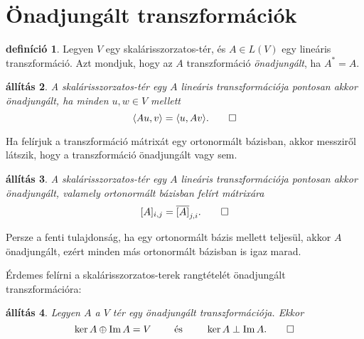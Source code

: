 \documentclass[9pt, a4paper, showtrims]{memoir}
\theoremstyle{plain}
\newtheorem{proposition}{állítás}[chapter]
\theoremstyle{remark}
\theoremstyle{definition}
\newtheorem{definition}[proposition]{definíció}
\DeclareMathOperator{\im}{Im}
\newcommand{\ip}[2]{\langle#1,#2\rangle}
\begin{document}
\section{Önadjungált transzformációk}
\begin{definition}
    Legyen $V$ egy skalárisszorzatos-tér, és $A\in L\left( V \right)$ egy lineáris transzformáció.
    Azt mondjuk, hogy az $A$ transzformáció 
    \emph{önadjungált},
    ha $A^\ast=A$.
\end{definition}

\begin{proposition}
    A skalárisszorzatos-tér egy $A$ lineáris transzformációja pontosan akkor önadjungált,
    ha minden $u,w\in V$ mellett
    \[
        \ip{Au}{v}
        =
        \ip{u}{Av}.
        \qedhere
    \]
\end{proposition}
Ha felírjuk a transzformáció mátrixát egy ortonormált bázisban, akkor messziről látszik,
hogy a transzformáció önadjungált vagy sem.
\begin{proposition}
    A skalárisszorzatos-tér egy $A$ lineáris transzformációja pontosan akkor önadjungált,
    valamely ortonormált bázisban felírt mátrixára
    \[
        [A]_{i,j}=\overline{[A]}_{j,i}.
        \qedhere
    \]
\end{proposition}
Persze a fenti tulajdonság, ha egy ortonormált bázis mellett teljesül,
akkor $A$ önadjungált, ezért minden más ortonormált bázisban is igaz marad.

Érdemes felírni a skalárisszorzatos-terek rangtételét önadjungált transzformációra:
\begin{proposition}
    Legyen $A$ a $V$ tér egy önadjungált transzformációja.
    Ekkor 
    \[
        \ker A\oplus\im A=V\qquad\text{ és }\qquad\ker A\perp\im A.
        \qedhere
    \]
\end{proposition}
\end{document}
